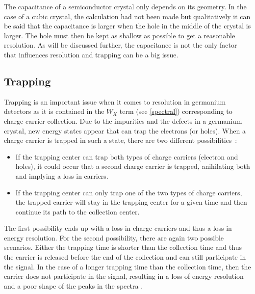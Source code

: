 \documentclass[11pt,a4paper]{article}
\begin{document}
The capacitance of a semiconductor crystal only depends on its geometry. In the case of a cubic crystal, the calculation had not been made but qualitatively it can be said that the capacitance is larger when the hole in the middle of the crystal is larger. The hole must then be kept as shallow as possible to get a reasonable resolution. As will be discussed further, the capacitance is not the only factor that influences resolution and trapping can be a big issue.

\subsection{Trapping}

Trapping is an important issue when it comes to resolution in germanium detectors as it is contained in the $W_X$ term (see \ref{spectral}) corresponding to charge carrier collection. Due to the impurities and the defects in a germanium crystal, new energy states appear that can trap the electrons (or holes). When a charge carrier is trapped in such a state, there are two different possibilities~:

\begin{itemize}
\item If the trapping center can trap both types of charge carriers (electron and holes), it could occur that a second charge carrier is trapped, anihilating both and implying a loss in carriers.
\item If the trapping center can only trap one of the two types of charge carriers, the trapped carrier will stay in the trapping center for a given time and then continue its path to the collection center.
\end{itemize}
The first possibility ends up with a loss in charge carriers and thus a loss in energy resolution. For the second possibility, there are again two possible scenarios. Either the trapping time is shorter than the collection time and thus the carrier is released before the end of the collection and can still participate in the signal. In the case of a longer trapping time than the collection time, then the carrier does not participate in the signal, resulting in a loss of energy resolution and a poor shape of the peaks in the spectra \cite{Tsoulfanidis}.
\end{document}
